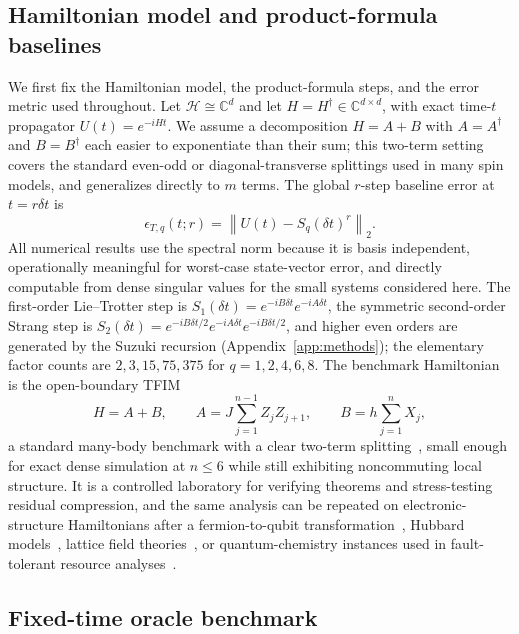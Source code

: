 \documentclass[aps,prxquantum,reprint,superscriptaddress,nofootinbib,amsmath,amssymb]{revtex4-2}
\newcommand{\tfim}{TFIM}
\newcommand{\norm}[1]{\left\lVert #1 \right\rVert}
\newcommand{\cH}{\mathcal{H}}
\newcommand{\dt}{\delta t}
\begin{document}
\subsection{Hamiltonian model and product-formula baselines}

We first fix the Hamiltonian model, the product-formula steps, and the error metric used throughout. Let $\cH\cong\mathbb{C}^d$ and let $H=H^\dagger\in\mathbb{C}^{d\times d}$, with exact time-$t$ propagator $U(t)=e^{-iHt}$. We assume a decomposition $H=A+B$ with $A=A^\dagger$ and $B=B^\dagger$ each easier to exponentiate than their sum; this two-term setting covers the standard even-odd or diagonal-transverse splittings used in many spin models, and generalizes directly to $m$ terms. The global $r$-step baseline error at $t=r\dt$ is
\begin{equation}
    \epsilon_{T,q}(t;r)=\norm{U(t)-S_q(\dt)^r}_2.
    \label{eq:baseline-error}
\end{equation}
All numerical results use the spectral norm because it is basis independent, operationally meaningful for worst-case state-vector error, and directly computable from dense singular values for the small systems considered here. The first-order Lie--Trotter step is $S_1(\dt)=e^{-iB\dt}e^{-iA\dt}$, the symmetric second-order Strang step is $S_2(\dt)=e^{-iB\dt/2}e^{-iA\dt}e^{-iB\dt/2}$, and higher even orders are generated by the Suzuki recursion (Appendix~\ref{app:methods}); the elementary factor counts are $2,3,15,75,375$ for $q=1,2,4,6,8$. The benchmark Hamiltonian is the open-boundary \tfim{}
\begin{equation}
    H=A+B,\qquad A=J\sum_{j=1}^{n-1}Z_jZ_{j+1},\qquad B=h\sum_{j=1}^{n}X_j,
    \label{eq:tfim}
\end{equation}
a standard many-body benchmark with a clear two-term splitting~\cite{sachdev2011,cerveralierta2018}, small enough for exact dense simulation at $n\leq6$ while still exhibiting noncommuting local structure. It is a controlled laboratory for verifying theorems and stress-testing residual compression, and the same analysis can be repeated on electronic-structure Hamiltonians after a fermion-to-qubit transformation~\cite{bravyi2002,whitfield2011,seeley2012,verstraete2005}, Hubbard models~\cite{cade2020}, lattice field theories~\cite{jordan2012}, or quantum-chemistry instances used in fault-tolerant resource analyses~\cite{babbush2018,babbush2019}.

\subsection{Fixed-time oracle benchmark}
\end{document}
